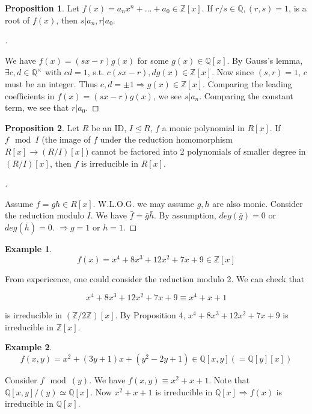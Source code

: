 \documentclass{article}
\theoremstyle{definition}
\newtheorem{ex}{Example}
\newtheorem{prop}{Proposition}
\newenvironment{proofs}[1][\proofname]{%
  \begin{proof}[#1]$ $\par\nobreak\ignorespaces
}{%
  \end{proof}
}
\begin{document}
\begin{prop}
  Let $f(x) = a_n x^n + \hdots + a_0 \in \mathbb{Z}[x]$. If $r/s \in \mathbb{Q}, (r, s) = 1$, is a root of $f(x)$, then $s|a_n, r|a_0$. 
\end{prop}

\begin{proofs}
  We have $f(x) = (sx-r) g(x)$ for some $g(x) \in \mathbb{Q}[x]$. By Gauss's lemma, $\exists c, d \in \mathbb{Q}^\times$ with $cd = 1$, s.t. $c(sx-r), dg(x) \in \mathbb{Z}[x]$. Now since $(s, r) = 1$, $c$ must be an integer. Thus $c, d = \pm 1 \Rightarrow g(x) \in \mathbb{Z}[x]$. Comparing the leading coefficients in $f(x) = (sx - r) g(x)$, we see $s | a_n$. Comparing the constant term, we see that $r|a_0$.  
\end{proofs}

\begin{prop}
  Let $R$ be an ID, $I \trianglelefteq R$, $f$ a monic polynomial in $R[x]$. If $f \mod I$ (the image of $f$ under the reduction homomorphism $R[x] \rightarrow (R/I)[x]$) cannot be factored into 2 polynomials of smaller degree in $(R/I)[x]$, then $f$ is irreducible in $R[x]$.  
\end{prop}

\begin{proofs}
  Assume $f = gh \in R[x]$. W.L.O.G. we may assume $g, h$ are also monic. Consider the reduction modulo $I$. We have $\bar{f} = \bar{g} \bar{h}$. By assumption, $deg(\bar{g}) = 0$ or $deg(\bar{h}) = 0$. $\Rightarrow g = 1$ or $h = 1$. 
\end{proofs}

\begin{ex}
  $$f(x) = x^4 + 8 x^3 + 12x^2 + 7x + 9 \in \mathbb{Z}[x]$$

  From expericence, one could consider the reduction modulo 2. We can check that 

  $$x^4 + 8x^3 + 12x^2 + 7x + 9 \equiv x^4 + x + 1$$

  is irreducible in $(\mathbb{Z}/2\mathbb{Z})[x]$. By Proposition 4, $x^4 + 8 x^3 + 12 x^2 + 7x + 9$ is irreducible in $\mathbb{Z}[x]$. 
\end{ex}

\begin{ex}
  $$f(x, y) = x^2 + (3y + 1)x + (y^2 - 2y + 1) \in \mathbb{Q}[x, y](=\mathbb{Q}[y][x])$$

  Consider $f \mod (y)$. We have $f(x, y) \equiv x^2 + x + 1$. Note that $\mathbb{Q}[x, y]/(y) \simeq \mathbb{Q}[x]$. Now $x^2 + x + 1$ is irreducible in $\mathbb{Q}[x] \Rightarrow f(x)$ is irreducible in $\mathbb{Q}[x]$.  
\end{ex}
\end{document}
